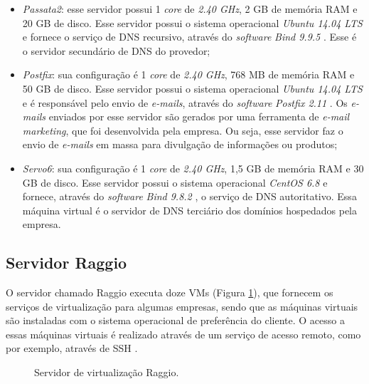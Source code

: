 \begin{itemize}
 \item \textit{Passata2}: esse servidor possui 1 \textit{core} de \textit{2.40 GHz}, 2 GB de memória \ac{RAM} e 20 GB de disco. 
 Esse servidor possui o sistema operacional \textit{Ubuntu 14.04 \ac{LTS}} \cite{ubuntu} e fornece o serviço de \ac{DNS} recursivo, através do 
 \textit{software} \textit{Bind 9.9.5} \cite{bind}. Esse é o servidor secundário de \ac{DNS} do provedor;
 
 \item \textit{Postfix}: sua configuração é 1 \textit{core} de \textit{2.40 GHz}, 768 MB de memória \ac{RAM} e 50 GB de disco. 
 Esse servidor possui o sistema operacional \textit{Ubuntu 14.04 \ac{LTS}} \cite{ubuntu} e é responsável pelo envio de \textit{e-mails}, 
 através do \textit{software} \textit{Postfix 2.11} \cite{postfix}. Os \textit{e-mails} enviados por esse servidor são gerados por uma 
 ferramenta de \textit{e-mail marketing}, que foi desenvolvida pela empresa. Ou seja, esse servidor faz o envio de \textit{e-mails} em massa 
 para divulgação de informações ou produtos;
 
 \item \textit{Servo6}: sua configuração é 1 \textit{core} de \textit{2.40 GHz}, 1,5 GB de memória \ac{RAM} e 30 GB de disco. 
 Esse servidor possui o sistema operacional \textit{CentOS 6.8} e fornece, através do \textit{software} \textit{Bind 9.8.2} \cite{bind}, o 
 serviço de \ac{DNS} autoritativo. Essa máquina virtual é o servidor de \ac{DNS} terciário dos domínios hospedados pela empresa.
\end{itemize}

\subsection{Servidor Raggio}
\label{section:serv_raggio}

O servidor chamado Raggio executa doze \ac{VM}s (Figura \ref{fig:servidor_raggio}), que fornecem os serviços de virtualização para algumas empresas,
sendo que as máquinas virtuais são instaladas com o sistema operacional de preferência do cliente. O acesso a essas máquinas virtuais é realizado
através de um serviço de acesso remoto, como por exemplo, através de \ac{SSH} \cite{barrett2005}.

\begin{figure}[h!]
 \centering
 \caption{Servidor de virtualização Raggio.}
 \label{fig:servidor_raggio}
\end{figure}

